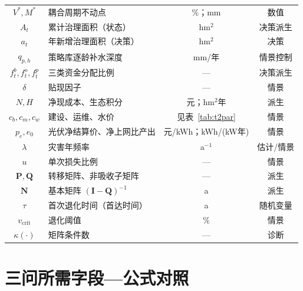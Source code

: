 \documentclass[11pt,a4paper]{ctexart}
\begin{document}
\begin{longtable}{|c|p{6.2cm}|c|c|}
$V^*,M^*$ & 耦合周期不动点 & \%；mm & 数值 \\
$A_t$ & 累计治理面积（状态） & hm$^2$ & 决策派生 \\
$a_t$ & 年新增治理面积（决策） & hm$^2$ & 决策 \\
$q_{p,h}$ & 策略库逐龄补水深度 & mm/年 & 情景控制 \\
$f_t^b,f_t^o,f_t^p$ & 三类资金分配比例 & — & 决策派生 \\
$\delta$ & 贴现因子 & — & 情景 \\
$N,H$ & 净现成本、生态积分 & 元；hm$^2$年 & 派生 \\
$c_b,c_m,c_w$ & 建设、运维、水价 & 见表~\ref{tab:t2par} & 情景 \\
$p_e,e_0$ & 光伏净结算价、净上网比产出 & 元/kWh；kWh/(kW年) & 情景 \\
$\lambda$ & 灾害年频率 & a$^{-1}$ & 估计/情景 \\
$u$ & 单次损失比例 & — & 情景 \\
$\bm{P},\bm{Q}$ & 转移矩阵、非吸收子矩阵 & — & 派生 \\
$\bm{N}$ & 基本矩阵 $(\bm{I}-\bm{Q})^{-1}$ & a & 派生 \\
$\tau$ & 首次退化时间（首达时间） & a & 随机变量 \\
$v_{\mathrm{crit}}$ & 退化阈值 & \% & 情景 \\
$\kappa(\cdot)$ & 矩阵条件数 & — & 诊断 \\
\hline
\end{longtable}

\section{三问所需字段—公式对照}\label{app:field}
\end{document}
